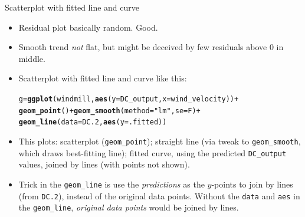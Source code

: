 \documentclass[unknownkeysallowed]{beamer}\usepackage[]{graphicx}\usepackage[]{color}
\makeatletter
\newcommand{\hlstr}[1]{\textcolor[rgb]{0.192,0.494,0.8}{#1}}%
\newcommand{\hlopt}[1]{\textcolor[rgb]{0,0,0}{#1}}%
\newcommand{\hlstd}[1]{\textcolor[rgb]{0.345,0.345,0.345}{#1}}%
\newcommand{\hlkwb}[1]{\textcolor[rgb]{0.69,0.353,0.396}{#1}}%
\newcommand{\hlkwc}[1]{\textcolor[rgb]{0.333,0.667,0.333}{#1}}%
\newcommand{\hlkwd}[1]{\textcolor[rgb]{0.737,0.353,0.396}{\textbf{#1}}}%
\newenvironment{kframe}{%
 \def\at@end@of@kframe{}%
 \ifinner\ifhmode%
  \def\at@end@of@kframe{\end{minipage}}%
  \begin{minipage}{\columnwidth}%
 \fi\fi%
 \def\FrameCommand##1{\hskip\@totalleftmargin \hskip-\fboxsep
 \colorbox{shadecolor}{##1}\hskip-\fboxsep
     \hskip-\linewidth \hskip-\@totalleftmargin \hskip\columnwidth}%
 \MakeFramed {\advance\hsize-\width
   \@totalleftmargin\z@ \linewidth\hsize
   \@setminipage}}%
 {\par\unskip\endMakeFramed%
 \at@end@of@kframe}
\newenvironment{knitrout}{}{} %
\makeatother
\begin{document}
\begin{frame}[fragile]{Scatterplot with fitted line and curve}

  \begin{itemize}

\item Residual plot basically random. Good.
\item Smooth trend \emph{not} flat, but might be deceived by few
  residuals above 0 in middle.
  \item Scatterplot with fitted line and curve like this:

\begin{knitrout}
\color{fgcolor}\begin{kframe}
\begin{alltt}
\hlstd{g}\hlkwb{=}\hlkwd{ggplot}\hlstd{(windmill,}\hlkwd{aes}\hlstd{(}\hlkwc{y}\hlstd{=DC_output,}\hlkwc{x}\hlstd{=wind_velocity))}\hlopt{+}
  \hlkwd{geom_point}\hlstd{()}\hlopt{+}\hlkwd{geom_smooth}\hlstd{(}\hlkwc{method}\hlstd{=}\hlstr{"lm"}\hlstd{,}\hlkwc{se}\hlstd{=F)}\hlopt{+}
  \hlkwd{geom_line}\hlstd{(}\hlkwc{data}\hlstd{=DC.2,}\hlkwd{aes}\hlstd{(}\hlkwc{y}\hlstd{=.fitted))}
\end{alltt}
\end{kframe}
\end{knitrout}

  \item This plots: scatterplot (\verb-geom_point-);
  straight line (via tweak to \verb-geom_smooth-, which
    draws best-fitting line);
  fitted curve, using the predicted \texttt{DC\_output}
    values, joined by lines (with points not shown).
  \item Trick in the \verb-geom_line- is use the \emph{predictions} as
    the $y$-points to join by lines (from \texttt{DC.2}), instead of
    the original data points. Without the \texttt{data} and
    \texttt{aes} in the \verb-geom_line-, \emph{original data points}
    would be joined by lines.

\end{itemize}
  
\end{frame}
\end{document}
